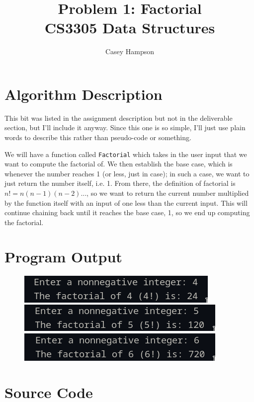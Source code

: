 \documentclass{article}
\title{Problem 1: Factorial  \\[8pt] CS3305 Data Structures}
\author{Casey Hampson}
\begin{document}
\maketitle


\section*{Algorithm Description}
This bit was listed in the assignment description but not in the deliverable section, but I'll include it anyway. Since this one is so simple, I'll just use plain words to describe this rather than pseudo-code or something.

We will have a function called \texttt{Factorial} which takes in the user input that we want to compute the factorial of. We then establish the base case, which is whenever the number reaches 1 (or less, just in case); in such a case, we want to just return the number itself, i.e. 1. From there, the definition of factorial is $n! = n(n-1)(n-2)...$, so we want to return the current number multiplied by the function itself with an input of one less than the current input. This will continue chaining back until it reaches the base case, 1, so we end up computing the factorial.



\section*{Program Output}

    \begin{figure}[htbp]
        \centering
        \includegraphics[scale=0.75]{res/4.png}
        \includegraphics[scale=0.75]{res/5.png}
        \includegraphics[scale=0.75]{res/6.png}
    \end{figure}

\pagebreak
\section*{Source Code}
\inputminted{java}{./P1.java}
\end{document}
